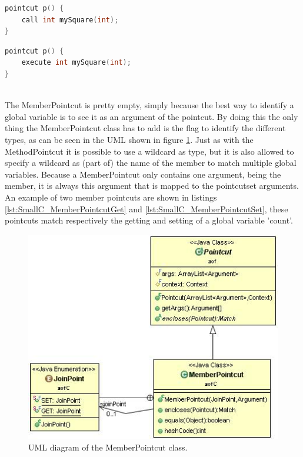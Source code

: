 \documentclass[a4paper]{report}
\begin{document}
\begin{minipage}{0.42\textwidth}
\begin{lstlisting}[language=C, caption=Example of a method call pointcut, label=lst:SmallC_MethodPointcutCall]
pointcut p() {
	call int mySquare(int);
}
\end{lstlisting}
\end{minipage}\hfill
\begin{minipage}{0.42\textwidth}
\begin{lstlisting}[language=C, caption=Example of a method execution pointcut, label=lst:SmallC_MethodPointcutExecute]
pointcut p() {
	execute int mySquare(int);
}
\end{lstlisting}
\end{minipage}
\\
The MemberPointcut is pretty empty, simply because the best way to identify a global variable is to see it as an argument of the pointcut. By doing this the only thing the MemberPointcut class has to add is the flag to identify the different types, as can be seen in the UML shown in figure \ref{fig:MemberPointcut}. Just as with the MethodPointcut it is possible to use a wildcard as type, but it is also allowed to specify a wildcard as (part of) the name of the member to match multiple global variables. Because a MemberPointcut only contains one argument, being the member, it is always this argument that is mapped to the pointcutset arguments. An example of two member pointcuts are shown in listings \ref{lst:SmallC_MemberPointcutGet} and \ref{lst:SmallC_MemberPointcutSet}, these pointcuts match respectively the getting and setting of a global variable 'count'.\\
\begin{figure}
\centering
\includegraphics[scale=0.7]{images/AOFC/MemberPointcut.jpg}
\caption{UML diagram of the MemberPointcut class.}
\label{fig:MemberPointcut}
\end{figure}\\
\end{document}

